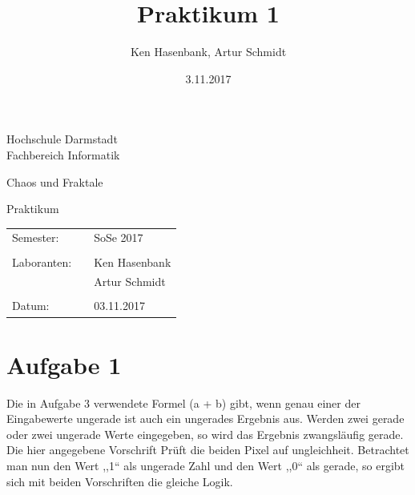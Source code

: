 \documentclass[10pt,a4paper]{article}
\author{Ken Hasenbank, Artur Schmidt}
\title{Praktikum 1}
\date{3.11.2017}
\begin{document}

\begin{titlepage}
\begin{center}
	\Large{Hochschule Darmstadt}\\
	\large{Fachbereich Informatik}
\end{center}

\vspace{1cm}
\begin{center}
	\large{Chaos und Fraktale}
\end{center}

\vspace{2,5cm}
\begin{center}
	\huge{Praktikum}\\
\end{center}



\vspace{6cm}
\begin{center}
{\large 
\begin{tabular}{lll}
	Semester: && SoSe 2017\\
	\vspace{1mm}\\
	Laboranten: && Ken Hasenbank\\
	&& Artur Schmidt\\
	\vspace{1 mm}\\
	Datum:	&& 03.11.2017\\
	\end{tabular} 
	}%
\end{center}

\end{titlepage}

\section{Aufgabe 1}
Die in Aufgabe 3 verwendete Formel (a + b) gibt, wenn genau einer der Eingabewerte ungerade ist auch ein ungerades Ergebnis aus. Werden zwei gerade oder zwei ungerade Werte eingegeben, so wird das Ergebnis zwangsläufig gerade.
\\
Die hier angegebene Vorschrift Prüft die beiden Pixel auf ungleichheit.
Betrachtet man nun den Wert ,,1`` als ungerade Zahl und den Wert ,,0`` als gerade, so ergibt sich mit beiden Vorschriften die gleiche Logik.
\end{document}

